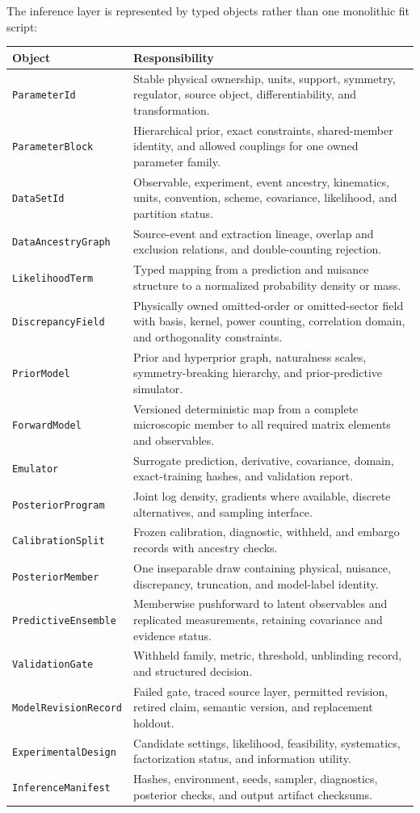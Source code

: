 \documentclass[11pt]{article}
\begin{document}
The inference layer is represented by typed objects rather than one monolithic
fit script:
\begin{longtable}{L{0.25\textwidth}L{0.66\textwidth}}
\toprule
Object & Responsibility\\
\midrule
\endhead
\texttt{ParameterId} &
Stable physical ownership, units, support, symmetry, regulator, source object,
differentiability, and transformation.\\
\texttt{ParameterBlock} &
Hierarchical prior, exact constraints, shared-member identity, and allowed
couplings for one owned parameter family.\\
\texttt{DataSetId} &
Observable, experiment, event ancestry, kinematics, units, convention, scheme,
covariance, likelihood, and partition status.\\
\texttt{DataAncestryGraph} &
Source-event and extraction lineage, overlap and exclusion relations, and
double-counting rejection.\\
\texttt{LikelihoodTerm} &
Typed mapping from a prediction and nuisance structure to a normalized
probability density or mass.\\
\texttt{DiscrepancyField} &
Physically owned omitted-order or omitted-sector field with basis, kernel,
power counting, correlation domain, and orthogonality constraints.\\
\texttt{PriorModel} &
Prior and hyperprior graph, naturalness scales, symmetry-breaking hierarchy,
and prior-predictive simulator.\\
\texttt{ForwardModel} &
Versioned deterministic map from a complete microscopic member to all required
matrix elements and observables.\\
\texttt{Emulator} &
Surrogate prediction, derivative, covariance, domain, exact-training hashes,
and validation report.\\
\texttt{PosteriorProgram} &
Joint log density, gradients where available, discrete alternatives, and
sampling interface.\\
\texttt{CalibrationSplit} &
Frozen calibration, diagnostic, withheld, and embargo records with ancestry
checks.\\
\texttt{PosteriorMember} &
One inseparable draw containing physical, nuisance, discrepancy, truncation,
and model-label identity.\\
\texttt{PredictiveEnsemble} &
Memberwise pushforward to latent observables and replicated measurements,
retaining covariance and evidence status.\\
\texttt{ValidationGate} &
Withheld family, metric, threshold, unblinding record, and structured decision.\\
\texttt{ModelRevisionRecord} &
Failed gate, traced source layer, permitted revision, retired claim, semantic
version, and replacement holdout.\\
\texttt{ExperimentalDesign} &
Candidate settings, likelihood, feasibility, systematics, factorization status,
and information utility.\\
\texttt{InferenceManifest} &
Hashes, environment, seeds, sampler, diagnostics, posterior checks, and output
artifact checksums.\\
\bottomrule
\end{longtable}
\end{document}
